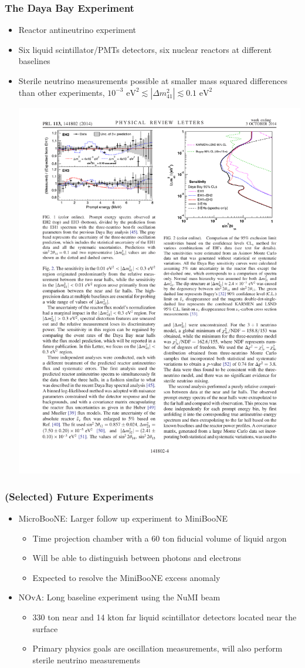 \documentclass[mathserif,18pt,xcolor=table]{beamer}
\begin{document}
\begin{frame}
  \frametitle{The Daya Bay Experiment}
  \begin{itemize}
  \item Reactor antineutrino experiment
  \item Six liquid scintillator/PMTs detectors, six nuclear reactors at different baselines
  \item Sterile neutrino measurements possible at smaller mass squared differences than other experiments, $10^{−3} \text{ eV}^2  \lesssim \left|\Delta m^{2}_{41}\right| \lesssim 0.1 \text{ eV}^2$
    \begin{center}
      \includegraphics[width=.5\linewidth]{../figures/daya1.pdf}
    \end{center}
  \end{itemize}
\end{frame}

\begin{frame}
  \frametitle{(Selected) Future Experiments}
  \begin{itemize}
  \item MicroBooNE: Larger follow up experiment to MiniBooNE
   \begin{itemize}
     \item Time projection chamber with a 60 ton fiducial volume of liquid argon
     \item Will be able to distinguish between photons and electrons
     \item Expected to resolve the MiniBooNE excess anomaly
   \end{itemize}
  \item NOvA: Long baseline experiment using the NuMI beam
   \begin{itemize}
     \item 330 ton near and 14 kton far liquid scintillator detectors located near the surface
     \item Primary physics goals are oscillation measurements, will also perform sterile neutrino measurements
   \end{itemize}
  \end{itemize}
\end{frame}
\end{document}
